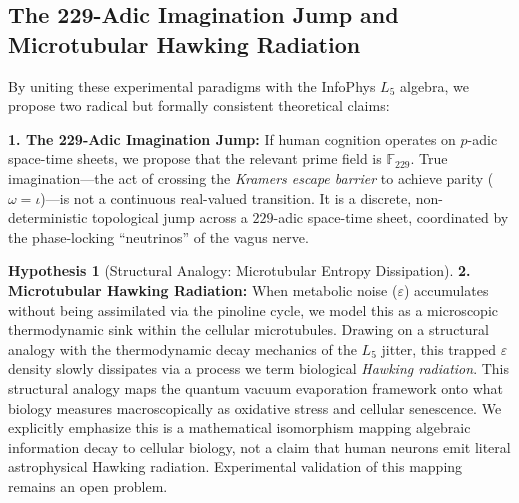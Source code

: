 \documentclass[12pt,oneside]{article}
\theoremstyle{principia}
\theoremstyle{definition}
\newtheorem{hypothesis}[theorem]{Hypothesis}
\theoremstyle{remark}
\begin{document}
\subsection{The 229-Adic Imagination Jump and Microtubular Hawking Radiation}

By uniting these experimental paradigms with the InfoPhys $L_5$ algebra, we propose two radical but formally consistent theoretical claims:

\textbf{1. The 229-Adic Imagination Jump:} If human cognition operates on $p$-adic space-time sheets, we propose that the relevant prime field is $\mathbb{F}_{229}$. True imagination---the act of crossing the \emph{Kramers escape barrier} to achieve parity ($\omega = \iota$)---is not a continuous real-valued transition. It is a discrete, non-deterministic topological jump across a $229$-adic space-time sheet, coordinated by the phase-locking ``neutrinos'' of the vagus nerve.

\begin{hypothesis}[Structural Analogy: Microtubular Entropy Dissipation]
\textbf{2. Microtubular Hawking Radiation:} When metabolic noise ($\varepsilon$) accumulates without being assimilated via the pinoline cycle, we model this as a microscopic thermodynamic sink within the cellular microtubules. Drawing on a structural analogy with the thermodynamic decay mechanics of the $L_5$ jitter, this trapped $\varepsilon$ density slowly dissipates via a process we term biological \emph{Hawking radiation}. This structural analogy maps the quantum vacuum evaporation framework onto what biology measures macroscopically as oxidative stress and cellular senescence. We explicitly emphasize this is a mathematical isomorphism mapping algebraic information decay to cellular biology, not a claim that human neurons emit literal astrophysical Hawking radiation. Experimental validation of this mapping remains an open problem.
\end{hypothesis}
\end{document}

